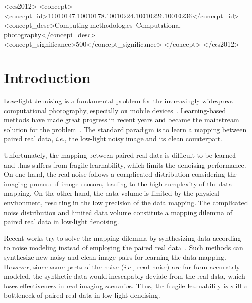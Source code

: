 \documentclass[sigconf,screen,nonacm]{acmart}
\newcommand{\ie}{\textit{i}.\textit{e}.}
\begin{document}
\begin{CCSXML}
<ccs2012>
   <concept>
       <concept_id>10010147.10010178.10010224.10010226.10010236</concept_id>
       <concept_desc>Computing methodologies~Computational photography</concept_desc>
       <concept_significance>500</concept_significance>
       </concept>
 </ccs2012>
\end{CCSXML}






\maketitle

\section{Introduction}\label{sec:Introduction}
Low-light denoising is a fundamental problem for the increasingly widespread computational photography, especially on mobile devices~\cite{ECCV20/Yuzhi}. Learning-based methods have made great progress in recent years and became the mainstream solution for the problem~\cite{TPAMI21/LowLightSurvey}.
The standard paradigm is to learn a mapping between paired real data, \ie, the low-light noisy image and its clean counterpart.

Unfortunately, the mapping between paired real data is difficult to be learned and thus suffers from fragile learnability, which limits the denoising performance.
On one hand, the real noise follows a complicated distribution considering the imaging process of image sensors, leading to the high complexity of the data mapping. On the other hand, the data volume is limited by the physical environment, resulting in the low precision of the data mapping.
The complicated noise distribution and limited data volume constitute a mapping dilemma of paired real data in low-light denoising.

Recent works try to solve the mapping dilemma by synthesizing data according to noise modeling instead of employing the paired real data~\cite{CVPR19/Unprocess,TPAMI21/ELD}. Such methods can synthesize new noisy and clean image pairs for learning the data mapping. However, since some parts of the noise (\ie, read noise) are far from accurately modeled, the synthetic data would inescapably deviate from the real data, which loses effectiveness in real imaging scenarios. Thus, the fragile learnability is still a bottleneck of paired real data in low-light denoising.
\end{document}
